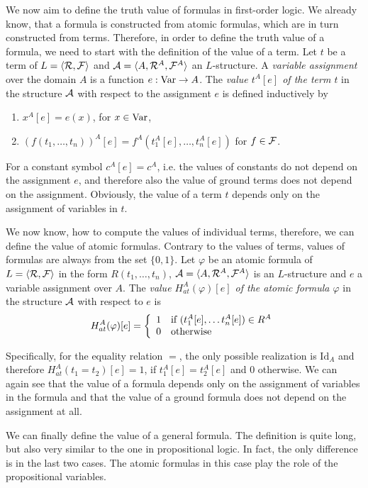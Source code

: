 We now aim to define the truth value of formulas in first-order logic. We already know, that a formula is constructed from atomic formulas, which are in turn constructed from terms. Therefore, in order to define the truth value of a formula, we need to start with the definition of the value of a term. Let $t$ be a term of $L = \langle \mathcal{R}, \mathcal{F} \rangle$ and $\mathcal{A} = \langle A, \mathcal{R}^A, \mathcal{F}^A \rangle$ an $L$-structure. A \emph{variable assignment} over the domain $A$ is a function $e: \operatorname{Var} \to A$. The \emph{value $t^A[e]$ of the term $t$} in the structure $\mathcal{A}$ with respect to the assignment $e$ is defined inductively by 
\begin{enumerate}
	\item $x^A[e] = e(x)$, for $x \in \operatorname{Var}$,
	\item $(f(t_1, \dots, t_n))^A[e] = f^A(t_1^A[e], \dots, t_n^A[e])$ for $f \in \mathcal{F}$.
\end{enumerate}
For a constant symbol $c^A[e] = c^A$, i.e. the values of constants do not depend on the assignment $e$, and therefore also the value of ground terms does not depend on the assignment. Obviously, the value of a term $t$ depends only on the assignment of variables in $t$.

We now know, how to compute the values of individual terms, therefore, we can define the value of atomic formulas. Contrary to the values of terms, values of formulas are always from the set $\{0,1\}$. Let $\varphi$ be an atomic formula of $L = \langle \mathcal{R}, \mathcal{F} \rangle$ in the form $R(t_1, \dots, t_n)$, $\mathcal{A} = \langle A, \mathcal{R}^A, \mathcal{F}^A \rangle$ is an $L$-structure and $e$ a variable assignment over $A$. The \emph{value $H^A_{at}(\varphi)[e]$ of the atomic formula $\varphi$} in the structure $\mathcal{A}$ with respect to $e$ is $$H^A_{at}(\varphi)[e] = \left\{ \begin{array}{ll} 1 & \text{if } (t_1^A[e], \dots t_n^A[e]) \in R^A \\ 0 & \text{otherwise} \end{array} \right.$$

Specifically, for the equality relation $=$, the only possible realization is $\mathrm{Id}_A$ and therefore $H^A_{at}(t_1=t_2)[e] = 1$, if $t_1^A[e]=t_2^A[e]$ and $0$ otherwise. We can again see that the value of a formula depends only on the assignment of variables in the formula and that the value of a ground formula does not depend on the assignment at all.

We can finally define the value of a general formula. The definition is quite long, but also very similar to the one in propositional logic. In fact, the only difference is in the last two cases. The atomic formulas in this case play the role of the propositional variables.

